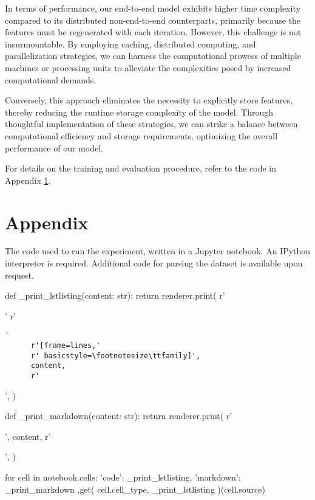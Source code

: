 \documentclass[letterpaper]{article} %
\begin{document}
In terms of performance, 
our end-to-end model exhibits higher time complexity compared to 
its distributed non-end-to-end counterparts, 
primarily because the features must be regenerated with each iteration. 
However, this challenge is not insurmountable. 
By employing caching, distributed computing, and parallelization strategies, 
we can harness the computational prowess of multiple machines 
or processing units to alleviate the complexities posed by 
increased computational demands.

Conversely, this approach eliminates the necessity to 
explicitly store features, thereby reducing the runtime storage complexity 
of the model. Through thoughtful implementation of these strategies, 
we can strike a balance between computational efficiency 
and storage requirements, optimizing the overall performance of our model.

For details on the training and evaluation procedure,
refer to the code in Appendix \ref{appendix:code}.




\appendix
\section{Appendix}\label{appendix:code}
The code used to run the experiment, written in a Jupyter notebook.
An IPython interpreter is required.
Additional code for parsing the dataset is available upon request.

\begin{python}
  def _print_lstlisting(content: str):
    return renderer.print(
      r'\par\noindent\ignorespaces'
      r'\begin{lstlisting}'
      r'[frame=lines,'
      r' basicstyle=\footnotesize\ttfamily]',
      content,
      r'\end{lstlisting}',
    )

  def _print_markdown(content: str):
    return renderer.print(
      r'\begin{markdown}',
      content,
      r'\end{markdown}',
    )

  for cell in notebook.cells:
    {
      'code': _print_lstlisting,
      'markdown': _print_markdown
    }.get(
      cell.cell_type,
      _print_lstlisting
    )(cell.source)
\end{python}
\end{document}
